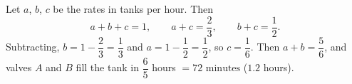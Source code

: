 Let $a$, $b$, $c$ be the rates in tanks per hour. Then
\[
a+b+c=1,\qquad a+c=\dfrac{2}{3},\qquad b+c=\dfrac{1}{2} .
\]
Subtracting, $b=1-\dfrac{2}{3}=\dfrac{1}{3}$ and $a=1-\dfrac{1}{2}=\dfrac{1}{2}$, so $c=\dfrac{1}{6}$. Then $a+b=\dfrac{5}{6}$, and valves $A$ and $B$ fill the tank in $\dfrac{6}{5}$ hours $=\boxed{72\text{ minutes}}$ ($1.2$ hours).
